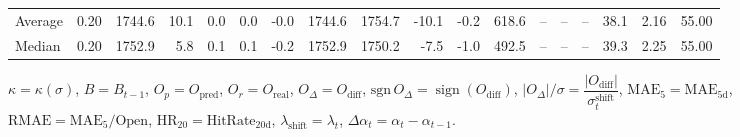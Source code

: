 \begin{threeparttable}
{\begin{tabular}{lrrrrrrrrrrrrrrrrr}
Average &     0.20 & 1744.6 &              10.1 &               0.0 &                0.0 &               -0.0 & 1744.6 & 1754.7 &      -10.1 &                     -0.2 &               618.6 &         -- &        -- &             -- &             38.1 &            2.16 &                  55.00 \\
 Median &     0.20 & 1752.9 &               5.8 &               0.1 &                0.1 &               -0.2 & 1752.9 & 1750.2 &       -7.5 &                     -1.0 &               492.5 &         -- &        -- &             -- &             39.3 &            2.25 &                  55.00 \\
\bottomrule
\end{tabular}
}
\begin{tablenotes}\footnotesize
\item $\kappa=\kappa(\sigma)$, $B=B_{t-1}$, $O_p=O_{\text{pred}}$, $O_r=O_{\text{real}}$, $O_\Delta=O_{\text{diff}}$, $\mathrm{sgn}\,O_\Delta=\operatorname{sign}(O_{\text{diff}})$, $|O_\Delta|/\sigma=\dfrac{|O_{\text{diff}}|}{\sigma_t^{\text{shift}}}$, $\mathrm{MAE}_5=\mathrm{MAE}_{5\text{d}}$, $\mathrm{RMAE}= \mathrm{MAE}_5 / \text{Open}$, $\mathrm{HR}_{20}=\mathrm{HitRate}_{20\text{d}}$, 
$\lambda_{\text{shift}}=\lambda_t$, 
$\Delta\alpha_t=\alpha_t-\alpha_{t-1}$.
\end{tablenotes}
\end{threeparttable}
\endgroup

